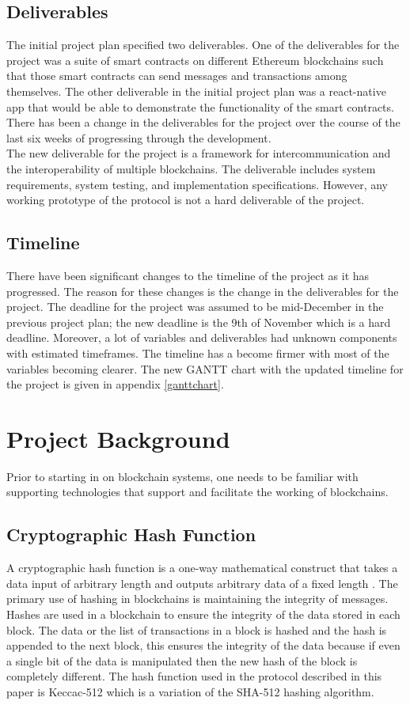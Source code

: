 \documentclass[a4paper,twoside,phd]{BYUPhys}
\begin{document}
\subsection{Deliverables}
The initial project plan specified two deliverables. One of the deliverables for the project was a suite of smart contracts on different Ethereum blockchains such that those smart contracts can send messages and transactions among themselves. The other deliverable in the initial project plan was a react-native app that would be able to demonstrate the functionality of the smart contracts. There has been a change in the deliverables for the project over the course of the last six weeks of progressing through the development. 
\\

The new deliverable for the project is a framework for intercommunication and the interoperability of multiple blockchains. The deliverable includes system requirements, system testing, and implementation specifications. However, any working prototype of the protocol is not a hard deliverable of the project.
\subsection{Timeline}
There have been significant changes to the timeline of the project as it has progressed. The reason for these changes is the change in the deliverables for the project. The deadline for the project was assumed to be mid-December in the previous project plan; the new deadline is the 9th of November which is a hard deadline. Moreover, a lot of variables and deliverables had unknown components with estimated timeframes. The timeline has a become firmer with most of the variables becoming clearer. The new GANTT chart with the updated timeline for the project is given in appendix \ref{ganttchart}.
\section{Project Background}
Prior to starting in on blockchain systems, one needs to be familiar with supporting technologies that support and facilitate the working of blockchains. 
\subsection{Cryptographic Hash Function}
A cryptographic hash function is a one-way mathematical construct that takes a data input of arbitrary length and outputs arbitrary data of a fixed length \cite{PreneelCRYPTOGRAPHICOVERVIEW}. The primary use of hashing in blockchains is maintaining the integrity of messages\cite{2018WhatAcademy}. Hashes are used in a blockchain to ensure the integrity of the data stored in each block. The data or the list of transactions in a block is hashed and the hash is appended to the next block, this ensures the integrity of the data because if even a single bit of the data is manipulated then the new hash of the block is completely different\cite{PreneelCRYPTOGRAPHICOVERVIEW}. The hash function used in the protocol described in this paper is Keccac-512 which is a variation of the SHA-512 hashing algorithm\cite{Bertoni2012KeccakOverview}. 
\end{document}

